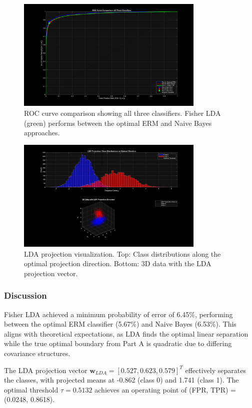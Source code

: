 \documentclass[12pt]{article}
\begin{document}
\begin{figure}[H]
    \centering
    \includegraphics[width=0.8\textwidth]{partC_ROC_comparison_all.png}
    \caption{ROC curve comparison showing all three classifiers. Fisher LDA (green) performs between the optimal ERM and Naive Bayes approaches.}
\end{figure}

\begin{figure}[H]
    \centering
    \includegraphics[width=0.8\textwidth]{partC_LDA_projection.png}
    \caption{LDA projection visualization. Top: Class distributions along the optimal projection direction. Bottom: 3D data with the LDA projection vector.}
\end{figure}

\subsubsection{Discussion}
Fisher LDA achieved a minimum probability of error of 6.45\%, performing between the optimal ERM classifier (5.67\%) and Naive Bayes (6.53\%). This aligns with theoretical expectations, as LDA finds the optimal linear separation while the true optimal boundary from Part A is quadratic due to differing covariance structures.

The LDA projection vector $\mathbf{w}_{LDA} = [0.527, 0.623, 0.579]^T$ effectively separates the classes, with projected means at -0.862 (class 0) and 1.741 (class 1). The optimal threshold $\tau = 0.5132$ achieves an operating point of (FPR, TPR) = (0.0248, 0.8618).
\end{document}
